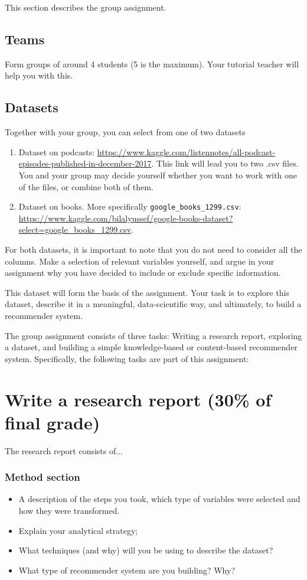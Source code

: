 This section describes the group assignment. 

\subsection*{Teams}


Form groups of around 4 students (5 is the maximum). Your tutorial teacher will help you with this.

\subsection*{Datasets}
Together with your group, you can select from one of two datasets
\begin{enumerate}
	\item Dataset on podcasts: \url{https://www.kaggle.com/listennotes/all-podcast-episodes-published-in-december-2017}. This link will lead you to two .csv files. You and your group may decide yourself whether you want to work with one of the files, or combine both of them.
	\item Dataset on books. More specifically \texttt{google\_books\_1299.csv}: \url{https://www.kaggle.com/bilalyussef/google-books-dataset?select=google_books_1299.csv}. 
\end{enumerate}

For both datasets, it is important to note that you do not need to consider all the columns. Make a selection of relevant variables yourself, and argue in your assignment why you have decided to include or exclude specific information. 

This dataset will form the basis of the assignment. Your task is to explore this dataset, describe it in a meaningful, data-scientific way, and ultimately, to build a recommender system.

The group assignment consists of three tasks: Writing a research report, exploring a dataset, and building a simple knowledge-based or content-based recommender system. Specifically, the following tasks are part of this assignment:

\section{Write a research report (30\% of final grade)}

The research report consists of...

\subsubsection{Method section}
\begin{itemize}
	\item A description of the steps you took, which type of variables were selected and how they were transformed.
	\item Explain your analytical strategy;
	\item What techniques (and why) will you be using to describe the dataset?
	\item What type of recommender system are you building? Why?  
\end{itemize}

